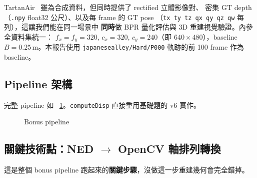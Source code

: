 \documentclass[12pt]{article}
\begin{document}
\noindent TartanAir~\cite{Wang2020} 雖為合成資料，但同時提供了 rectified 立體影像對、
密集 GT depth（\texttt{.npy} float32 公尺）、以及每 frame 的 GT pose
（\texttt{tx ty tz qx qy qz qw} 每列），這讓我們能在同一場景中
\textbf{同時}做 BPR 量化評估與 3D 重建視覺驗證。內參全資料集統一：
$f_x=f_y=320$, $c_x=320$, $c_y=240$（即 $640\!\times\!480$），baseline
$B=0.25\,\mathrm{m}$。本報告使用 \texttt{japanesealley/Hard/P000} 軌跡的前
100 frame 作為 baseline。

\subsection{Pipeline 架構}
完整 pipeline 如 \figurename~\ref{fig:bonus-pipeline}。\texttt{computeDisp} 直接重用基礎題的 v6 實作。
\newline

    
\begin{figure}[ht]
\begin{center}
  \caption{Bonus pipeline}
  \label{fig:bonus-pipeline}
\end{center}
\end{figure}

\subsection{關鍵技術點：NED $\to$ OpenCV 軸排列轉換}
\label{sec:bonus-pose}
這是整個 bonus pipeline 跑起來的\textbf{關鍵步驟}，沒做這一步重建幾何會完全錯掉。
\end{document}
